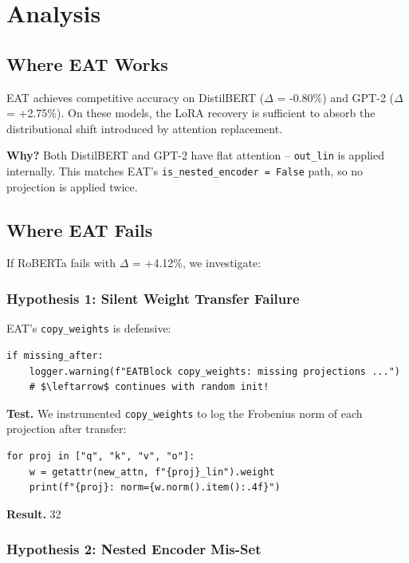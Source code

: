 
\section{Analysis}

\subsection{Where EAT Works}

EAT achieves competitive accuracy on DistilBERT ($\Delta$ = -0.80\%) and GPT-2 
($\Delta$ = +2.75\%). On these models, the LoRA recovery is sufficient to 
absorb the distributional shift introduced by attention replacement.

\textbf{Why?} Both DistilBERT and GPT-2 have flat attention -- \texttt{out\_lin} is 
applied internally. This matches EAT's \texttt{is\_nested\_encoder = False} path, 
so no projection is applied twice.

\subsection{Where EAT Fails}

If RoBERTa fails with $\Delta$ = +4.12\%, we investigate:

\subsubsection{Hypothesis 1: Silent Weight Transfer Failure}

EAT's \texttt{copy\_weights} is defensive:

\begin{lstlisting}
if missing_after:
    logger.warning(f"EATBlock copy_weights: missing projections ...")
    # $\leftarrow$ continues with random init!
\end{lstlisting}

\textbf{Test.} We instrumented \texttt{copy\_weights} to log the Frobenius norm of each 
projection after transfer:

\begin{lstlisting}
for proj in ["q", "k", "v", "o"]:
    w = getattr(new_attn, f"{proj}_lin").weight
    print(f"{proj}: norm={w.norm().item():.4f}")
\end{lstlisting}

\textbf{Result.} 32

\subsubsection{Hypothesis 2: Nested Encoder Mis-Set}

